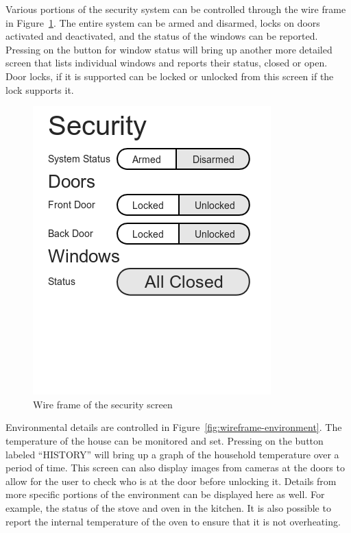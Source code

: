 \documentclass{report}
\begin{document}
Various portions of the security system can be controlled through the wire frame
in Figure~\ref{fig:wireframe-security}. The entire system can be armed and
disarmed, locks on doors activated and deactivated, and the status of the
windows can be reported. Pressing on the button for window status will bring up
another more detailed screen that lists individual windows and reports their
status, closed or open. Door locks, if it is supported can be locked or
unlocked from this screen if the lock supports it.


\begin{figure}[H]
    \centering
    \includegraphics[scale=0.5]{mock_security}
    \caption[Wire frame of the security screen]
            {Wire frame of the security screen}
    \label{fig:wireframe-security}
\end{figure}

Environmental details are controlled in Figure~\ref{fig:wireframe-environment}. The
temperature of the house can be monitored and set. Pressing on the button
labeled ``HISTORY'' will bring up a graph of the household temperature over a
period of time. This screen can also display images from cameras at the doors
to allow for the user to check who is at the door before unlocking it.
Details from more specific portions of the environment can be displayed here as
well. For example, the status of the stove and oven in the kitchen. It is also
possible to report the internal temperature of the oven to ensure that it is
not overheating.
\end{document}
